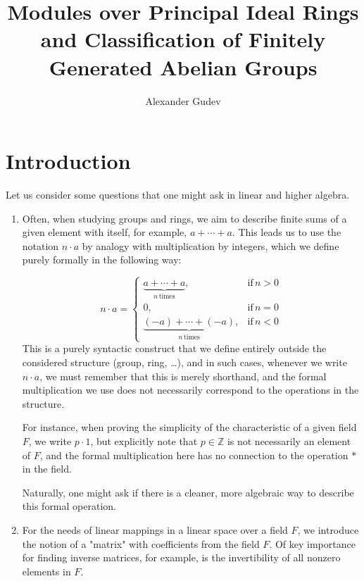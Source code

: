 \documentclass{article}
\title{Modules over Principal Ideal Rings and Classification of Finitely Generated Abelian Groups}
\author{Alexander Gudev}
\date{\vspace{-0.4in}}
\newif\ifusemulticols
\theoremstyle{definition}
\theoremstyle{remark}
\theoremstyle{plain}
\theoremstyle{plain}
\newenvironment{mymulticols}
    { \ifusemulticols \begin{multicols}{2} \fi }
    { \ifusemulticols \end{multicols} \fi }
\newcommand{\Z}{\mathbb{Z}}
\begin{document}
\maketitle

\begin{mymulticols}

\section{Introduction}

Let us consider some questions that one might ask in linear and higher algebra.

\begin{enumerate}
    \item
        Often, when studying groups and rings, we aim to describe finite sums of a given element
        with itself, for example, $a + \cdots + a$. 
        This leads us to use the notation $n \cdot a$ by analogy with multiplication by integers,
        which we define purely formally in the following way:

\[
n \cdot a =
\begin{cases}
    \underbrace{a +\cdots+ a}_{n\,\text{times}}   ,& \text{if} \, n > 0\\
    0                                               ,& \text{if} \, n = 0\\
    \underbrace{(- a) +\cdots+(- a)}_{n\,\text{times}} ,& \text{if} \, n < 0
\end{cases}
\]
        This is a purely syntactic construct that we define entirely outside the considered
        structure (group, ring, \ldots), and in such cases, whenever we write $n \cdot a$, we must
        remember that this is merely shorthand, and the formal multiplication we use does not
        necessarily correspond to the operations in the structure.

        For instance, when proving the simplicity of the characteristic of a given field $F$, we
        write $p \cdot 1$, but explicitly note that $p \in \Z$ is not necessarily an element of $F$,
        and the formal multiplication here has no connection to the operation $*$ in the field.

        Naturally, one might ask if there is a cleaner, more algebraic way to describe this formal
        operation.

    \item
        For the needs of linear mappings in a linear space over a field $F$, we introduce the notion
        of a "matrix" with coefficients from the field $F$. Of key importance for finding inverse
        matrices, for example, is the invertibility of all nonzero elements in $F$.


\end{enumerate}
\end{mymulticols}
\end{document}
